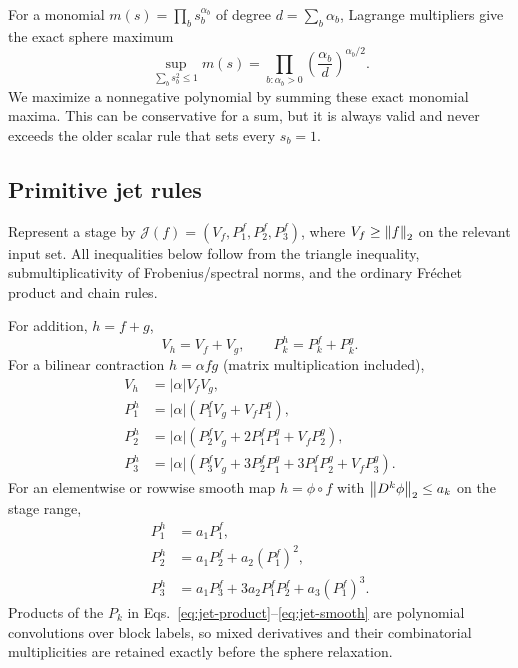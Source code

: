 For a monomial $m(s)=\prod_b s_b^{\alpha_b}$ of degree
$d=\sum_b\alpha_b$, Lagrange multipliers give the exact sphere maximum
\begin{equation}
 \sup_{\sum_b s_b^2\le1}m(s)
 =\prod_{b:\alpha_b>0}\left(\frac{\alpha_b}{d}\right)^{\alpha_b/2}.
 \label{eq:monomial-sphere}
\end{equation}
We maximize a nonnegative polynomial by summing these exact monomial maxima.
This can be conservative for a sum, but it is always valid and never exceeds
the older scalar rule that sets every $s_b=1$.

\subsection{Primitive jet rules}

Represent a stage by $\mathcal J(f)=(V_f,P_1^f,P_2^f,P_3^f)$, where
$V_f\ge\left\lVert f\right\rVert_2$ on the relevant input set.  All inequalities below follow
from the triangle inequality, submultiplicativity of Frobenius/spectral norms,
and the ordinary Fr\'echet product and chain rules.

For addition, $h=f+g$,
\begin{equation}
 V_h=V_f+V_g,\qquad P_k^h=P_k^f+P_k^g.
 \label{eq:jet-add}
\end{equation}
For a bilinear contraction $h=\alpha f g$ (matrix multiplication included),
\begin{align}
V_h&=|\alpha|V_fV_g,\nonumber\\
P_1^h&=|\alpha|(P_1^fV_g+V_fP_1^g),\nonumber\\
P_2^h&=|\alpha|(P_2^fV_g+2P_1^fP_1^g+V_fP_2^g),\nonumber\\
P_3^h&=|\alpha|(P_3^fV_g+3P_2^fP_1^g
 +3P_1^fP_2^g+V_fP_3^g).
 \label{eq:jet-product}
\end{align}
For an elementwise or rowwise smooth map $h=\phi\circ f$ with
$\left\lVert D^k\phi\right\rVert_2\le a_k$ on the stage range,
\begin{align}
P_1^h&=a_1P_1^f,\nonumber\\
P_2^h&=a_1P_2^f+a_2(P_1^f)^2,\nonumber\\
P_3^h&=a_1P_3^f+3a_2P_1^fP_2^f+a_3(P_1^f)^3.
 \label{eq:jet-smooth}
\end{align}
Products of the $P_k$ in Eqs.~\eqref{eq:jet-product}--\eqref{eq:jet-smooth}
are polynomial convolutions over block labels, so mixed derivatives and their
combinatorial multiplicities are retained exactly before the sphere relaxation.

